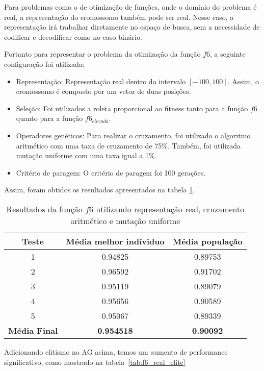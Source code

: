 Para problemas como o de otimização de funções, onde o dominio do problema é real, a
representação do cromossomo também pode ser real. Nesse caso, a representação irá
trabalhar diretamente no espaço de busca, sem a necessidade de codificar e decodificar
como no caso binário.

Portanto para representar o problema da otimização da função $f6$, a seguinte configuração foi utilizada:
\begin{itemize}
	\item Representação: Representação real dentro do intervalo $[-100,100]$. Assim, o cromossomo é composto por um vetor de duas posições.

	\item Seleção: Foi utilizados a roleta proporcional ao fitness tanto para a função $f6$
		quanto para a função $f6_{elevada}$.

    \item Operadores genéticos: Para realizar o cruzamento, foi utilizado o algoritmo
    aritmético com uma taxa de cruzamento de 75\%. Também, foi utilizada mutação uniforme
    com uma taxa igual a 1\%.
	\item Critério de paragem: O critério de paragem foi 100 gerações.
\end{itemize}

Assim, foram obtidos os resultados apresentados na tabela \ref{tab:f6_real}.

\begin{table}[htb]
	\centering
	\begin{tabular}{|c|c|c|}
		\hline
		\rowcolor[HTML]{9B9B9B}
		Teste & Média melhor indíviduo & Média população \\\hline
		1 & 0.94825 & 0.89753 \\\hline
		2 & 0.96592 & 0.91702 \\\hline
		3 & 0.95119 & 0.89079 \\\hline
		4 & 0.95656 & 0.90589 \\\hline
		5 & 0.95067 & 0.89339 \\\hline
		\textbf{Média Final} & \textbf{0.954518} & \textbf{0.90092} \\\hline	\end{tabular}
	\caption{Resultados da função $f6$ utilizando representação real, cruzamento aritmético e mutação uniforme \label{tab:f6_real}}
\end{table}

Adicionando elitismo no AG acima, temos um aumento de performance significativo, como mostrado
na tabela~\ref{tab:f6_real_elite}

